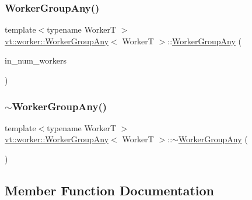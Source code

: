 \subsubsection{\texorpdfstring{Worker\+Group\+Any()}{WorkerGroupAny()}\hspace{0.1cm}{\footnotesize\ttfamily [2/2]}}
{\footnotesize\ttfamily template$<$typename WorkerT $>$ \\
\hyperlink{structvt_1_1worker_1_1_worker_group_any}{vt\+::worker\+::\+Worker\+Group\+Any}$<$ WorkerT $>$\+::\hyperlink{structvt_1_1worker_1_1_worker_group_any}{Worker\+Group\+Any} (\begin{DoxyParamCaption}\item[{\hyperlink{namespacevt_aa93398ea48f2cb6c188512250f7cc248}{Worker\+Count\+Type} const \&}]{in\+\_\+num\+\_\+workers }\end{DoxyParamCaption})}

\mbox{\label{structvt_1_1worker_1_1_worker_group_any_a2427146b080679942534b8723475ade3}} 
\subsubsection{\texorpdfstring{$\sim$\+Worker\+Group\+Any()}{~WorkerGroupAny()}}
{\footnotesize\ttfamily template$<$typename WorkerT $>$ \\
\hyperlink{structvt_1_1worker_1_1_worker_group_any}{vt\+::worker\+::\+Worker\+Group\+Any}$<$ WorkerT $>$\+::$\sim$\hyperlink{structvt_1_1worker_1_1_worker_group_any}{Worker\+Group\+Any} (\begin{DoxyParamCaption}{ }\end{DoxyParamCaption})\hspace{0.3cm}{\ttfamily [virtual]}}



\subsection{Member Function Documentation}
\mbox{\label{structvt_1_1worker_1_1_worker_group_any_ad935117e72318af02e1554be480d3db6}} 
